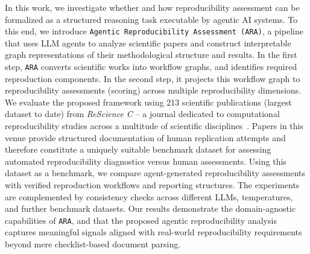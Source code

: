 \documentclass{article}
\begin{document}
In this work, we investigate whether and how reproducibility assessment can be formalized as a structured reasoning task executable by agentic AI systems. 
To this end, we introduce \texttt{Agentic Reproducibility Assessment (ARA)}, a pipeline that uses LLM agents to analyze scientific papers and construct interpretable graph representations of their methodological structure and results. 
In the first step, \texttt{ARA} converts scientific works into workflow graphs, and identifies required reproduction components.
In the second step, it projects this workflow graph to reproducibility assessments (scoring) across multiple reproducibility dimensions.
We evaluate the proposed framework using 213 scientific publications (largest dataset to date) from \textit{ReScience C} -- a journal dedicated to computational reproducibility studies across a multitude of scientific disciplines~\citep{rougier2018rescience}. 
Papers in this venue provide structured documentation of human replication attempts and therefore constitute a uniquely suitable benchmark dataset for assessing automated reproducibility diagnostics versus human assessments.
Using this dataset as a benchmark, we compare agent-generated reproducibility assessments with verified reproduction workflows and reporting structures.
The experiments are complemented by consistency checks across different LLMs, temperatures, and further benchmark datasets.
Our results demonstrate the domain-agnostic capabilities of \texttt{ARA}, and that the proposed agentic reproducibility analysis captures meaningful signals aligned with real-world reproducibility requirements beyond mere checklist-based document parsing. %
\end{document}
